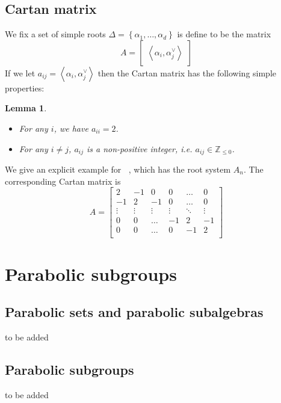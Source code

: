 \documentclass[12pt]{article} %
\newtheorem{lemma}[definition]{Lemma}
\DeclareMathOperator{\slnr}{\mathfrak{sl}_n(\mathbb{R})}
\begin{document}
\subsection{Cartan matrix}
We fix a set of simple roots $\Delta = \left\lbrace \alpha_1,\ldots,\alpha_d \right\rbrace$ is define to be the matrix
\[A = \begin{bmatrix} \left\langle \alpha_i,\alpha_j^\vee  \right\rangle
    \end{bmatrix}\]
If we let $a_{ij}=  \left\langle \alpha_i,\alpha_j^\vee\right\rangle$ then the Cartan matrix has the following simple properties:
\begin{lemma}
    \hfill
    \begin{itemize}
        \item For any $i$, we have $a_{ii}=2$.
        \item For any $i \ne j$, $a_{ij}$ is a non-positive integer, i.e. $a_{ij} \in \mathbb{Z}_{\le 0}$.
    \end{itemize}
\end{lemma}
We give an explicit example for $\slnr$, which has the root system $A_n$. The corresponding Cartan matrix is
\[A = \begin{bmatrix}
        2      & -1     & 0      & 0      & \ldots & 0      \\
        -1     & 2      & -1     & 0      & \ldots & 0      \\
        \vdots & \vdots & \vdots & \vdots & \ddots & \vdots \\
        0      & 0      & \ldots & -1     & 2      & -1     \\
        0      & 0      & \ldots & 0     & -1      & 2     \\
    \end{bmatrix}\]
\section{Parabolic subgroups}
\subsection{Parabolic sets and parabolic subalgebras}
to be added
\subsection{Parabolic subgroups}
to be added
\end{document}
